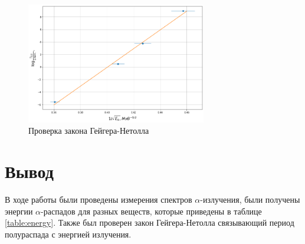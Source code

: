 \documentclass[11.5pt,a4paper,russian]{article}
\begin{document}
\begin{figure}[h!]
  \centering
  \includegraphics[width=0.7\textwidth]{ea5bb392-4357-4db4-853a-a0e22ec27231}  \caption{Проверка закона Гейгера-Нетолла}
  \label{fig:gey_net}
\end{figure}

\newpage
\section{Вывод}
В ходе работы были проведены измерения спектров $\alpha$-излучения, были получены энергии $\alpha$-распадов для разных веществ, которые приведены в таблице \ref{table:energy}. Также был проверен закон Гейгера-Нетолла связывающий период полураспада с энергией излучения.
\end{document}
